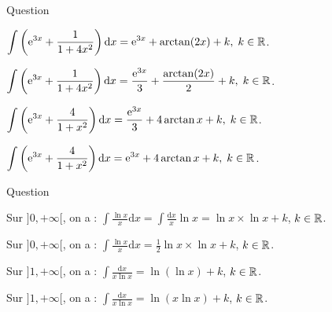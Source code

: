 \begin{multi}[multiple,feedback=
{Utiliser la linéarité en remarquant que : \(\displaystyle \int \mathrm{e}^{3x}\mathrm{d}x=\frac{\mathrm{e}^{3x}}{3}+k_1\),
\[\int \frac{\mathrm{d}x}{1+4x^2}=\frac{\arctan (2x)}{2}+k_2\quad \mbox{et}\quad \int \frac{4\, \mathrm{d}x}{1+x^2}=4\arctan x+k_3,\; k_i\in \Rr.\]
}]{Question}
    \item \(\displaystyle \int \left(\mathrm{e}^{3x}+\frac{1}{1+4x^2}\right)\mathrm{d}x=\mathrm{e}^{3x}+\arctan (2x)+k,\; k\in \mathbb{R}\).
    \item* \(\displaystyle \int \left(\mathrm{e}^{3x}+\frac{1}{1+4x^2}\right)\mathrm{d}x=\frac{\mathrm{e}^{3x}}{3}+\frac{\arctan (2x)}{2}+k,\; k\in \mathbb{R}\).
    \item* \(\displaystyle \int \left(\mathrm{e}^{3x}+\frac{4}{1+x^2}\right)\mathrm{d}x=\frac{\mathrm{e}^{3x}}{3}+4\arctan x+k,\; k\in \mathbb{R}\).
    \item \(\displaystyle \int \left(\mathrm{e}^{3x}+\frac{4}{1+x^2}\right)\mathrm{d}x=\mathrm{e}^{3x}+4\arctan x+k,\; k\in \mathbb{R}\).
\end{multi}


\begin{multi}[multiple,feedback=
{Avec \(u=\ln x\), on aura : \(\displaystyle \mathrm{d}u=\frac{\mathrm{d}x}{x}\). D'où
\[\int \frac{\ln x}{x}\mathrm{d}x=\int u\,\mathrm{d}u=\frac{1}{2}u^2+k=\frac{1}{2}\left(\ln x\right)^2+k,\; k\in \Rr\]
et
\[\int \frac{\mathrm{d}x}{x\ln x}=\int \frac{\mathrm{d}u}{u}=\ln |u|+k=\ln (\ln x)+k,\; k\in \Rr.\]
}]{Question}
    \item Sur \(]0,+\infty[\), on a : \(\displaystyle \int \frac{\ln x}{x}\mathrm{d}x=\int \frac{\mathrm{d}x}{x}\ln x=\ln x\times \ln x+k\), \(k\in \mathbb{R}\).
    \item* Sur \(]0,+\infty[\), on a : \(\displaystyle \int \frac{\ln x}{x}\mathrm{d}x=\frac{1}{2}\ln x\times \ln x+k\), \(k\in \mathbb{R}\).
    \item* Sur \(]1,+\infty[\), on a : \(\displaystyle \int \frac{\mathrm{d}x}{x\ln x}=\ln (\ln x)+k\), \(k\in \mathbb{R}\).
    \item Sur \(]1,+\infty[\), on a : \(\displaystyle \int \frac{\mathrm{d}x}{x\ln x}=\ln (x\ln x)+k\), \(k\in \mathbb{R}\).
\end{multi}


